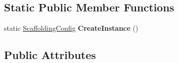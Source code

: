 \subsection*{Static Public Member Functions}
\begin{DoxyCompactItemize}
\item 
\hypertarget{class_scaffolding_1_1_scaffolding_config_a3afd16290e0676708bed1189efeffc6e}{static \hyperlink{class_scaffolding_1_1_scaffolding_config}{Scaffolding\+Config} {\bfseries Create\+Instance} ()}\label{class_scaffolding_1_1_scaffolding_config_a3afd16290e0676708bed1189efeffc6e}

\end{DoxyCompactItemize}
\subsection*{Public Attributes}
